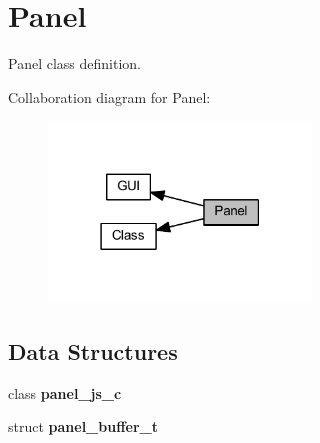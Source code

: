 \section{Panel}
\label{group___panel}


Panel class definition.  


Collaboration diagram for Panel\+:\nopagebreak
\begin{figure}[H]
\begin{center}
\leavevmode
\includegraphics[width=198pt]{group___panel}
\end{center}
\end{figure}
\subsection*{Data Structures}
\begin{DoxyCompactItemize}
\item 
class \textbf{ panel\+\_\+js\+\_\+c}
\item 
struct \textbf{ panel\+\_\+buffer\+\_\+t}
\end{DoxyCompactItemize}
